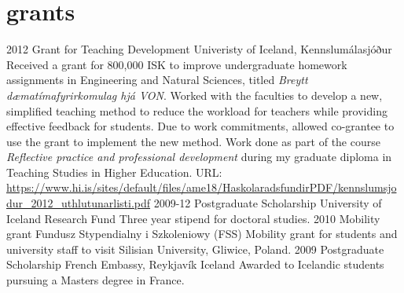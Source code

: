 \section{grants}
\begin{entrylist}
\entry
{2012}
{Grant for Teaching Development}
{Univeristy of Iceland, Kennslumálasjóður}
{Received a grant for 800,000 ISK to improve undergraduate homework assignments in Engineering and Natural Sciences, titled \emph{Breytt dæmatímafyrirkomulag hjá VON}. Worked with the faculties to develop a new, simplified teaching method to reduce the workload for teachers while providing effective feedback for students. Due to work commitments, allowed co-grantee to use the grant to implement the new method. Work done as part of the course 
\textit{Reflective practice and professional development} during my graduate diploma in Teaching Studies in Higher Education.	
URL: \url{https://www.hi.is/sites/default/files/ame18/HaskolaradsfundirPDF/kennslumsjodur_2012_uthlutunarlisti.pdf}
}
\entry
{2009-12}
{Postgraduate Scholarship}
{University of Iceland Research Fund}
{Three year stipend for doctoral studies.}
\entry
{2010}
{Mobility grant}
{Fundusz Stypendialny i Szkoleniowy (FSS)} 
{Mobility grant for students and university staff to visit Silisian University, Gliwice, Poland.}
\entry
{2009}
{Postgraduate Scholarship}
{French Embassy, Reykjavík Iceland}
{Awarded to Icelandic students pursuing a Masters degree in France.}
\end{entrylist}
